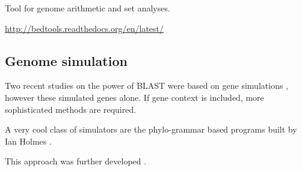   Tool for genome arithmetic and set analyses.

  \url{http://bedtools.readthedocs.org/en/latest/}

\subsection{Genome simulation}

  Two recent studies on the power of BLAST were based on gene simulations
  \cite{moyers_phylostratigraphic_2015,moyers_evaluating_2016}, however these
  simulated genes alone. If gene context is included, more sophisticated
  methods are required.

  A very cool class of simulators are the phylo-grammar based programs built by
  Ian Holmes \cite{klosterman_xrate:_2006}. 

  This approach was further developed \cite{westesson_developing_2012}.
